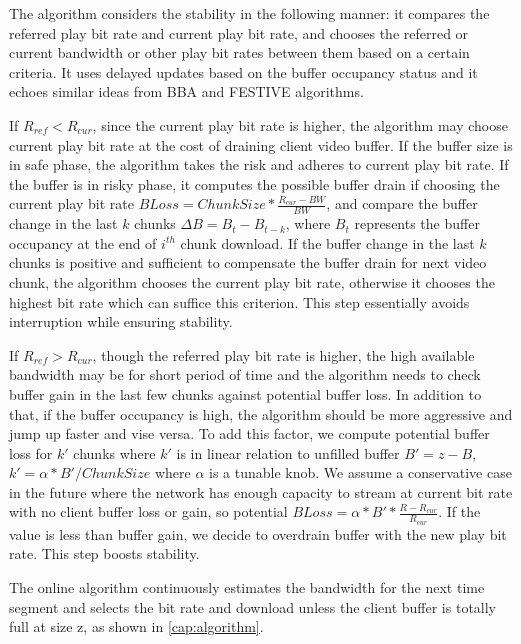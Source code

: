 The algorithm considers the stability in the following manner: it compares the referred play bit rate and current play bit rate, and chooses the referred or current bandwidth or other play bit rates between them based on a certain criteria. It uses delayed updates based on the buffer occupancy status and it echoes similar ideas from BBA and FESTIVE algorithms\cite{BBA, Festive}. 

If $R_{ref} < R_{cur}$, since the current play bit rate is higher, the algorithm may choose current play bit rate at the cost of draining client video buffer. If the buffer size is in safe phase, the algorithm takes the risk and adheres to current play bit rate. If the buffer is in risky phase, it computes the possible buffer drain if choosing the current play bit rate $BLoss =ChunkSize*\frac{R_{cur}-BW}{BW}$, and compare the buffer change in the last $k$ chunks $\Delta B = B_{t} -B_{t-k}$, where $B_{t}$ represents the buffer occupancy at the end of $i^{th}$ chunk download. If the buffer change in the last $k$ chunks is positive and sufficient to compensate the buffer drain for next video chunk, the algorithm chooses the current play bit rate, otherwise it chooses the highest bit rate which can suffice this criterion. This step essentially avoids interruption while ensuring stability.

If $R_{ref} >R_{cur} $, though the referred play bit rate is higher, the high available bandwidth may be for short period of time and the algorithm needs to check buffer gain in the last few chunks against potential buffer loss. In addition to that, if the buffer occupancy is high, the algorithm should be more aggressive and jump up faster and vise versa. To add this factor, we compute potential buffer loss for $k'$ chunks where $k'$ is in linear relation to unfilled buffer $B'=z-B$, $k'=\alpha * B'/ChunkSize$ where $\alpha$ is a tunable knob. We assume a conservative case in the future where the network has enough capacity to stream at current bit rate with no client buffer loss or gain, so potential $BLoss=\alpha * B' *\frac{R-R_{cur}}{R_{cur}} $. If the value is less than buffer gain, we decide to overdrain buffer with the new play bit rate. This step boosts stability.

The online algorithm continuously estimates the bandwidth for the next time segment and selects the bit rate and download unless the client buffer is totally full at size z, as shown in \autoref{cap:algorithm}. 



